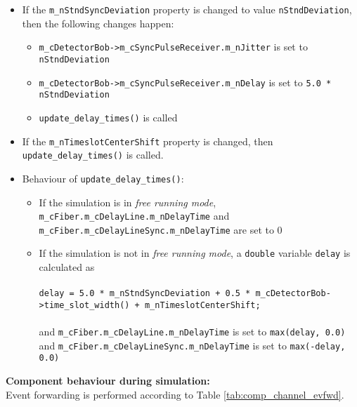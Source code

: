 \begin{itemize}

\item If the \texttt{m\_nStndSyncDeviation} property is changed to value \texttt{nStndDeviation}, then the following changes happen:

\begin {itemize}

\item \texttt{m\_cDetectorBob->m\_cSyncPulseReceiver.m\_nJitter} is set to \texttt{nStndDeviation}

\item \texttt{m\_cDetectorBob->m\_cSyncPulseReceiver.m\_nDelay} is set to \texttt{5.0 * nStndDeviation}

\item \texttt{update\_delay\_times()} is called

\end {itemize}

\item If the \texttt{m\_nTimeslotCenterShift} property is changed, then \texttt{update\_delay\_times()} is called.

\item Behaviour of \texttt{update\_delay\_times()}:

\begin{itemize}

\item If the simulation is in \textit{free running mode}, \texttt{m\_cFiber.m\_cDelayLine.m\_nDelayTime} and \texttt{m\_cFiber.m\_cDelayLineSync.m\_nDelayTime} are set to 0

\item If the simulation is not in \textit{free running mode}, a \texttt{double} variable \texttt{delay} is calculated as \\
\\
\texttt{delay = 5.0 * m\_nStndSyncDeviation + 0.5 * m\_cDetectorBob->time\_slot\_width() + m\_nTimeslotCenterShift;}\\
\\
and \texttt{m\_cFiber.m\_cDelayLine.m\_nDelayTime} is set to \texttt{max(delay, 0.0)} and \texttt{m\_cFiber.m\_cDelayLineSync.m\_nDelayTime} is set to \texttt{max(-delay, 0.0)}

\end{itemize}

\end{itemize}
\noindent
\textbf{Component behaviour during simulation:}\\
Event forwarding is performed according to Table \ref{tab:comp_channel_evfwd}.

